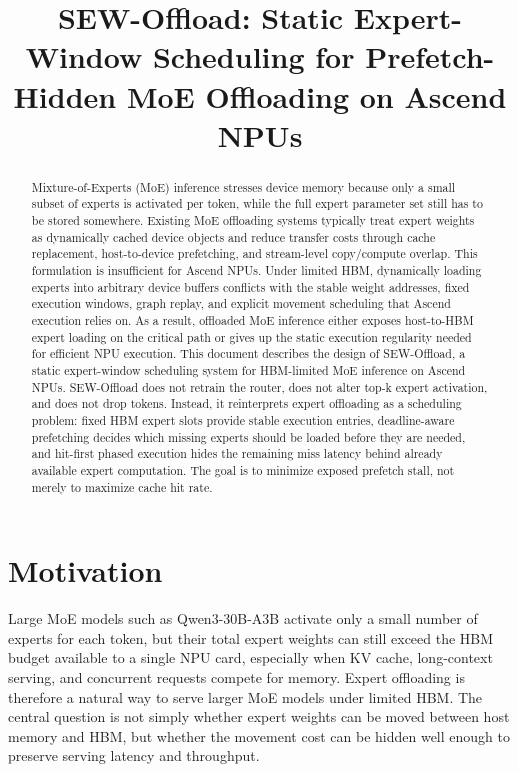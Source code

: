 \documentclass[10pt]{article}
\title{SEW-Offload: Static Expert-Window Scheduling for Prefetch-Hidden MoE Offloading on Ascend NPUs}
\author{}
\date{}
\begin{document}
\maketitle

\begin{abstract}
Mixture-of-Experts (MoE) inference stresses device memory because only a small
subset of experts is activated per token, while the full expert parameter set
still has to be stored somewhere. Existing MoE offloading systems typically
treat expert weights as dynamically cached device objects and reduce transfer
costs through cache replacement, host-to-device prefetching, and stream-level
copy/compute overlap. This formulation is insufficient for Ascend NPUs. Under
limited HBM, dynamically loading experts into arbitrary device buffers conflicts
with the stable weight addresses, fixed execution windows, graph replay, and
explicit movement scheduling that Ascend execution relies on. As a result,
offloaded MoE inference either exposes host-to-HBM expert loading on the
critical path or gives up the static execution regularity needed for efficient
NPU execution. This document describes the design of SEW-Offload, a static
expert-window scheduling system for HBM-limited MoE inference on Ascend NPUs.
SEW-Offload does not retrain the
router, does not alter top-k expert activation, and does not drop tokens.
Instead, it reinterprets expert offloading as a scheduling problem: fixed HBM
expert slots provide stable execution entries, deadline-aware prefetching
decides which missing experts should be loaded before they are needed, and
hit-first phased execution hides the remaining miss latency behind already
available expert computation. The goal is to minimize exposed prefetch stall,
not merely to maximize cache hit rate.
\end{abstract}

\section{Motivation}

Large MoE models such as Qwen3-30B-A3B activate only a small number of experts
for each token, but their total expert weights can still exceed the HBM budget
available to a single NPU card, especially when KV cache, long-context serving,
and concurrent requests compete for memory. Expert offloading is therefore a
natural way to serve larger MoE models under limited HBM. The central question
is not simply whether expert weights can be moved between host memory and HBM,
but whether the movement cost can be hidden well enough to preserve serving
latency and throughput.
\end{document}
